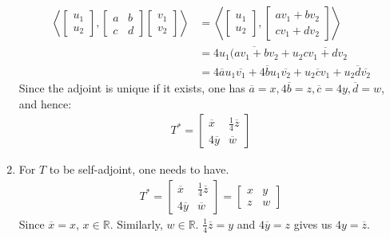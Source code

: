 \documentclass{article}
\begin{document}
\begin{enumerate}[label=(\alph*)]
\begin{align*}
    \left \langle \left[\begin{array}{r}
u_1  \\
u_2 
\end{array}\right] ,  \left[\begin{array}{rr}
a & b \\
c & d
\end{array}\right] \left[\begin{array}{r}
v_1  \\
v_2 
\end{array}\right] \right \rangle &= \left \langle \left[\begin{array}{r}
u_1 \\
u_2
\end{array}\right] , \left[\begin{array}{r}
av_1+bv_2  \\
cv_1+dv_2 
\end{array}\right] \right \rangle \\
&= 4u_1 \overline{(av_1+bv_2} + u_2 \overline{cv_1+dv_2} \\
&= 4\overline{a} u_1 \overline{v_1}+ 4 \overline{b} u_1 \overline{v_2} + u_2 \overline{c} v_1 + u_2 \overline{d} \overline{v_2}
\end{align*}
Since the adjoint is unique if it exists, one has $\overline{a}=x, 4\overline{b}=z, \overline{c}=4y, \overline{d}=w$, and hence:
\begin{align*}
    T^* = \left[\begin{array}{rr}
\overline{x} & \frac{1}{4}\overline{z} \\
4\overline{y} & \overline{w}
\end{array}\right]
\end{align*}
\item For $T$ to be self-adjoint, one needs to have.
\begin{align*}
    T^* = \left[\begin{array}{rr}
\overline{x} & \frac{1}{4}\overline{z} \\
4\overline{y} & \overline{w}
\end{array}\right] = \left[\begin{array}{rr}
x & y \\
z & w
\end{array}\right]
\end{align*}
Since $\overline{x}=x$, $x \in \mathbb{R}$. Similarly, $w \in \mathbb{R}$. $\frac{1}{4}\overline{z}=y$ and $4\overline{y}=z$ gives us $4y=\overline{z}$.
\end{enumerate}
\end{document}
